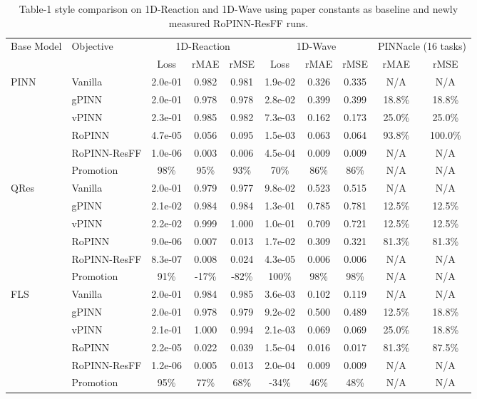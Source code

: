 \begin{table}[t]
  \caption{Table-1 style comparison on 1D-Reaction and 1D-Wave using paper constants as baseline and newly measured RoPINN-ResFF runs.}
  \label{tab:ropinn-table1-rw}
  \centering
  \begin{small}
    \setlength{\tabcolsep}{3pt}
    \begin{tabular}{llcccccccc}
      \toprule
      \multirow{2}{*}{Base Model} & \multirow{2}{*}{Objective} & \multicolumn{3}{c}{1D-Reaction} & \multicolumn{3}{c}{1D-Wave} & \multicolumn{2}{c}{PINNacle (16 tasks)} \\
      \cmidrule(lr){3-5}\cmidrule(lr){6-8}\cmidrule(lr){9-10}
       &  & Loss & rMAE & rMSE & Loss & rMAE & rMSE & rMAE & rMSE \\
      \midrule
      \multirow{6}{*}{PINN} & Vanilla & 2.0e-01 & 0.982 & 0.981 & 1.9e-02 & 0.326 & 0.335 & N/A & N/A \\
       & gPINN & 2.0e-01 & 0.978 & 0.978 & 2.8e-02 & 0.399 & 0.399 & 18.8\% & 18.8\% \\
       & vPINN & 2.3e-01 & 0.985 & 0.982 & 7.3e-03 & 0.162 & 0.173 & 25.0\% & 25.0\% \\
       & RoPINN & 4.7e-05 & 0.056 & 0.095 & 1.5e-03 & 0.063 & 0.064 & 93.8\% & 100.0\% \\
       & RoPINN-ResFF & 1.0e-06 & 0.003 & 0.006 & 4.5e-04 & 0.009 & 0.009 & N/A & N/A \\
       & Promotion & 98\% & 95\% & 93\% & 70\% & 86\% & 86\% & N/A & N/A \\
      \midrule
      \multirow{6}{*}{QRes} & Vanilla & 2.0e-01 & 0.979 & 0.977 & 9.8e-02 & 0.523 & 0.515 & N/A & N/A \\
       & gPINN & 2.1e-02 & 0.984 & 0.984 & 1.3e-01 & 0.785 & 0.781 & 12.5\% & 12.5\% \\
       & vPINN & 2.2e-02 & 0.999 & 1.000 & 1.0e-01 & 0.709 & 0.721 & 12.5\% & 12.5\% \\
       & RoPINN & 9.0e-06 & 0.007 & 0.013 & 1.7e-02 & 0.309 & 0.321 & 81.3\% & 81.3\% \\
       & RoPINN-ResFF & 8.3e-07 & 0.008 & 0.024 & 4.3e-05 & 0.006 & 0.006 & N/A & N/A \\
       & Promotion & 91\% & -17\% & -82\% & 100\% & 98\% & 98\% & N/A & N/A \\
      \midrule
      \multirow{6}{*}{FLS} & Vanilla & 2.0e-01 & 0.984 & 0.985 & 3.6e-03 & 0.102 & 0.119 & N/A & N/A \\
       & gPINN & 2.0e-01 & 0.978 & 0.979 & 9.2e-02 & 0.500 & 0.489 & 12.5\% & 18.8\% \\
       & vPINN & 2.1e-01 & 1.000 & 0.994 & 2.1e-03 & 0.069 & 0.069 & 25.0\% & 18.8\% \\
       & RoPINN & 2.2e-05 & 0.022 & 0.039 & 1.5e-04 & 0.016 & 0.017 & 81.3\% & 87.5\% \\
       & RoPINN-ResFF & 1.2e-06 & 0.005 & 0.013 & 2.0e-04 & 0.009 & 0.009 & N/A & N/A \\
       & Promotion & 95\% & 77\% & 68\% & -34\% & 46\% & 48\% & N/A & N/A \\
      \bottomrule
    \end{tabular}
  \end{small}
\end{table}

